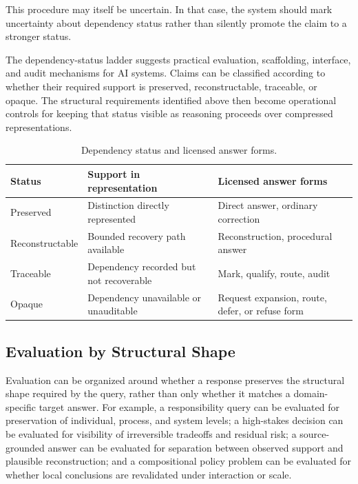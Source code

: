 \documentclass[11pt]{article}
\begin{document}
This procedure may itself be uncertain. In that case, the system should mark uncertainty about dependency status rather than silently promote the claim to a stronger status.

The dependency-status ladder suggests practical evaluation, scaffolding, interface, and audit mechanisms for AI systems. Claims can be classified according to whether their required support is preserved, reconstructable, traceable, or opaque. The structural requirements identified above then become operational controls for keeping that status visible as reasoning proceeds over compressed representations.

\begin{table}[h]
\centering
\caption{Dependency status and licensed answer forms.}
\label{tab:dependency_status_answer_forms}
\begin{tabular}{lll}
\toprule
\textbf{Status} & \textbf{Support in representation} & \textbf{Licensed answer forms} \\
\midrule
Preserved & Distinction directly represented & Direct answer, ordinary correction \\
Reconstructable & Bounded recovery path available & Reconstruction, procedural answer \\
Traceable & Dependency recorded but not recoverable & Mark, qualify, route, audit \\
Opaque & Dependency unavailable or unauditable & Request expansion, route, defer, or refuse form \\
\bottomrule
\end{tabular}
\end{table}

\subsection{Evaluation by Structural Shape}

Evaluation can be organized around whether a response preserves the structural shape required by the query, rather than only whether it matches a domain-specific target answer. For example, a responsibility query can be evaluated for preservation of individual, process, and system levels; a high-stakes decision can be evaluated for visibility of irreversible tradeoffs and residual risk; a source-grounded answer can be evaluated for separation between observed support and plausible reconstruction; and a compositional policy problem can be evaluated for whether local conclusions are revalidated under interaction or scale.
\end{document}
